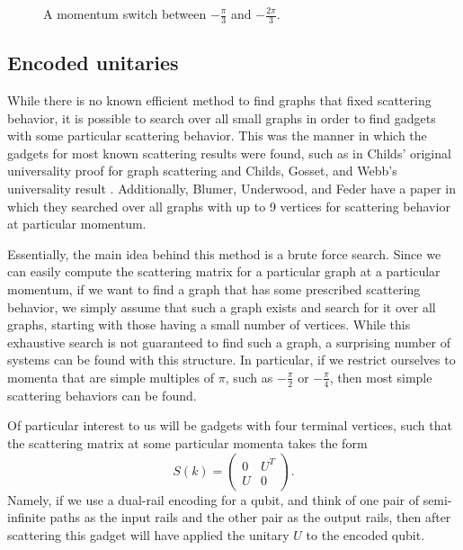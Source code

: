 \documentclass[../thesis-main/thesis-main]{subfiles}
\begin{document}
\begin{figure}
  \centering
  
  \caption{A momentum switch between $-\frac{\pi}{3}$ and $-\frac{2\pi}{3}$.}
  \label{fig:mom_switch_ex}
\end{figure}


\subsection{Encoded unitaries}

While there is no known efficient method to find graphs that fixed scattering behavior, it is possible to search over all small graphs in order to find gadgets with some particular scattering behavior.  This was the manner in which the gadgets for most known scattering results were found, such as in Childs' original universality proof for graph scattering \cite{Chi09} and Childs, Gosset, and Webb's universality result \cite{MPQW}.  Additionally, Blumer, Underwood, and Feder have a paper \cite{BUF11} in which they searched over all graphs with up to 9 vertices for scattering behavior at particular momentum.

Essentially, the main idea behind this method is a brute force search.  Since we can easily compute the scattering matrix for a particular graph at a particular momentum, if we want to find a graph that has some prescribed scattering behavior, we simply assume that such a graph exists and search for it over all graphs, starting with those having a small number of vertices.  While this exhaustive search is not guaranteed to find such a graph, a surprising number of systems can be found with this structure.  In particular, if we restrict ourselves to momenta that are simple multiples of $\pi$, such as $-\frac{\pi}{2}$ or $-\frac{\pi}{4}$, then most simple scattering behaviors can be found.  

Of particular interest to us will be gadgets with four terminal vertices, such that the scattering matrix at some particular momenta takes the form
\begin{equation}
  S(k) = \begin{pmatrix} 0 & U^T\\
    U & 0\end{pmatrix}. \label{eq:encoded_scat}
\end{equation}
Namely, if we use a dual-rail encoding for a qubit, and think of one pair of semi-infinite paths as the input rails and the other pair as the output rails, then after scattering this gadget will have applied the unitary $U$ to the encoded qubit.
\end{document}
